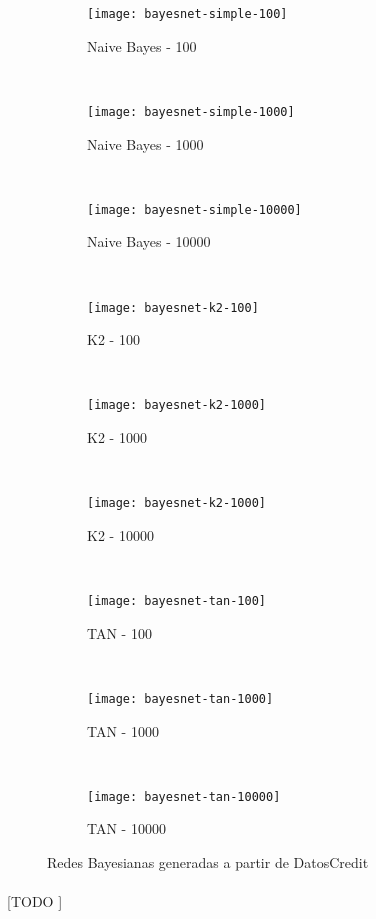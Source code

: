 \documentclass{article}
\begin{document}
			\begin{figure}[h]
				\centering
				\begin{subfigure}{.32\textwidth}
					\centering
					\texttt{[image: bayesnet-simple-100]}
					\caption{Naive Bayes - 100}
				\end{subfigure} \
				\begin{subfigure}{.32\textwidth}
					\centering
					\texttt{[image: bayesnet-simple-1000]}
					\caption{Naive Bayes - 1000}
				\end{subfigure} \
				\begin{subfigure}{.32\textwidth}
					\centering
					\texttt{[image: bayesnet-simple-10000]}
					\caption{Naive Bayes - 10000}
				\end{subfigure} \\
				\begin{subfigure}{.32\textwidth}
					\centering
					\texttt{[image: bayesnet-k2-100]}
					\caption{K2 - 100}
				\end{subfigure} \
				\begin{subfigure}{.32\textwidth}
					\centering
					\texttt{[image: bayesnet-k2-1000]}
					\caption{K2 - 1000}
				\end{subfigure} \
				\begin{subfigure}{.32\textwidth}
					\centering
					\texttt{[image: bayesnet-k2-1000]}
					\caption{K2 - 10000}
				\end{subfigure} \\
				\begin{subfigure}{.32\textwidth}
					\centering
					\texttt{[image: bayesnet-tan-100]}
					\caption{TAN - 100}
				\end{subfigure} \
				\begin{subfigure}{.32\textwidth}
					\centering
					\texttt{[image: bayesnet-tan-1000]}
					\caption{TAN - 1000}
				\end{subfigure} \
				\begin{subfigure}{.32\textwidth}
					\centering
					\texttt{[image: bayesnet-tan-10000]}
					\caption{TAN - 10000}
				\end{subfigure}
				\caption{Redes Bayesianas generadas a partir de DatosCredit}
				\label{fig:bayes_network}
			\end{figure}


			\paragraph{}
			[TODO ]
	\nocite{garciparedes:machine-learning-bayesian-2}
	\nocite{subject:taa}
	\nocite{tool:weka}
  
  
\end{document}
